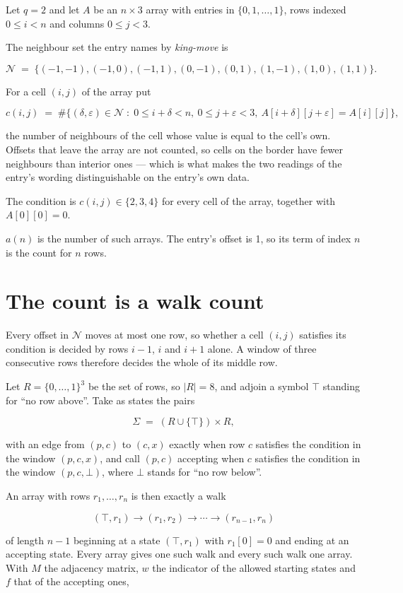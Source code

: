 \documentclass[11pt]{article}
\theoremstyle{definition}
\begin{document}
Let $q = 2$ and let $A$ be an $n \times 3$ array with entries in $\{0,1,\dots,1\}$, rows indexed $0 \le i < n$ and columns $0 \le j < 3$.

The neighbour set the entry names by {\itshape king-move} is

\[\mathcal{N} \;=\; \{(-1,-1), (-1,0), (-1,1), (0,-1), (0,1), (1,-1), (1,0), (1,1)\}.\]

For a cell $(i,j)$ of the array put

\[c(i,j) \;=\; \#\bigl\{(\delta,\varepsilon)\in\mathcal{N} \;:\; 0\le i+\delta<n,\ 0\le j+\varepsilon<3,\ A[i+\delta][j+\varepsilon] = A[i][j]\bigr\},\]

the number of neighbours of the cell whose value is equal to the cell's own. Offsets that leave the array are not counted, so cells on the border have fewer neighbours than interior ones --- which is what makes the two readings of the entry's wording distinguishable on the entry's own data.

The condition is $c(i,j) \in \{2, 3, 4\}$ for every cell of the array, together with $A[0][0]=0$.

$a(n)$ is the number of such arrays. The entry's offset is 1, so its term of index $n$ is the count for $n$ rows.

\section{The count is a walk count}

Every offset in $\mathcal{N}$ moves at most one row, so whether a cell $(i,j)$ satisfies its condition is decided by rows $i-1$, $i$ and $i+1$ alone. A window of three consecutive rows therefore decides the whole of its middle row.

Let $R = \{0,\dots,1\}^{3}$ be the set of rows, so $|R| = 8$, and adjoin a symbol $\top$ standing for ``no row above''. Take as states the pairs

\[\Sigma \;=\; (R \cup \{\top\}) \times R,\]

with an edge from $(p,c)$ to $(c,x)$ exactly when row $c$ satisfies the condition in the window $(p,c,x)$, and call $(p,c)$ accepting when $c$ satisfies the condition in the window $(p,c,\bot)$, where $\bot$ stands for ``no row below''.

An array with rows $r_1,\dots,r_n$ is then exactly a walk

\[(\top,r_1) \to (r_1,r_2) \to \cdots \to (r_{n-1},r_n)\]

of length $n-1$ beginning at a state $(\top,r_1)$ with $r_1[0]=0$ and ending at an accepting state. Every array gives one such walk and every such walk one array. With $M$ the adjacency matrix, $w$ the indicator of the allowed starting states and $f$ that of the accepting ones,
\end{document}
